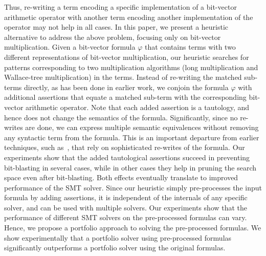 Thus, re-writing a term encoding a specific implementation of a
bit-vector arithmetic operator with another term encoding another
implementation of the operator may not help in all cases.  In this
paper, we present a heuristic alternative to address the above
problem, focusing only on bit-vector multiplication.  Given a
bit-vector formula $\varphi$ that contains terms with two different
representations of bit-vector multiplication, our heuristic searches
for patterns corresponding to two multiplication algorithms (long
multiplication and Wallace-tree multiplication) in the terms. Instead
of re-writing the matched sub-terms directly, as has been done in
earlier work, we conjoin the formula $\varphi$ with additional
assertions that equate a matched sub-term with the corresponding
bit-vector arithmetic operator.  Note that each added assertion is a
tautology, and hence does not change the semantics of the formula.
Significantly, since no re-writes are done, we can express multiple
semantic equivalences without removing any syntactic term from the
formula.  This is an important departure from earlier techniques, such
as~\cite{kolbl}, that rely on sophisticated re-writes of the
formula. Our experiments show that the added tautological assertions
succeed in preventing bit-blasting in several cases, while in other
cases they help in pruning the search space even after bit-blasting.
Both effects eventually translate to improved performance of the SMT
solver.  Since our heuristic simply pre-processes the input formula by
adding assertions, it is independent of the internals of any specific
solver, and can be used with multiple solvers.  Our experiments show
that the performance of different SMT solvers on the pre-processed
formulas can vary.  Hence, we propose a portfolio approach to solving
the pre-processed formulas.  We show experimentally that a portfolio
solver using pre-processed formulas significantly outperforms a
portfolio solver using the original formulas.



%
